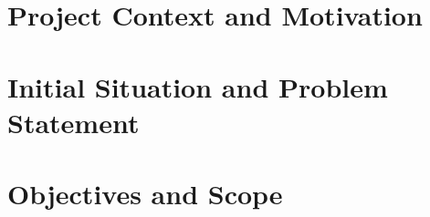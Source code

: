 \section{Project Context and Motivation}\label{sec:introduction:context}

\section{Initial Situation and Problem Statement}\label{sec:introduction:problem}

\section{Objectives and Scope}\label{sec:introduction:objectives}

